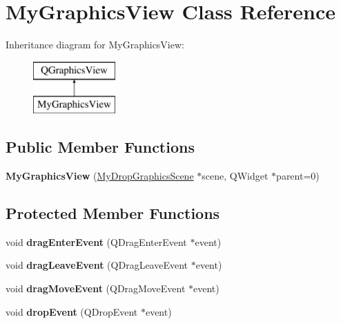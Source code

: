 \hypertarget{class_my_graphics_view}{}\section{My\+Graphics\+View Class Reference}
\label{class_my_graphics_view}
Inheritance diagram for My\+Graphics\+View\+:\begin{figure}[H]
\begin{center}
\leavevmode
\includegraphics[height=2.000000cm]{class_my_graphics_view}
\end{center}
\end{figure}
\subsection*{Public Member Functions}
\begin{DoxyCompactItemize}
\item 
\hypertarget{class_my_graphics_view_a7236beae467bc43ed9f88222b25d4874}{}{\bfseries My\+Graphics\+View} (\hyperlink{class_my_drop_graphics_scene}{My\+Drop\+Graphics\+Scene} $\ast$scene, Q\+Widget $\ast$parent=0)\label{class_my_graphics_view_a7236beae467bc43ed9f88222b25d4874}

\end{DoxyCompactItemize}
\subsection*{Protected Member Functions}
\begin{DoxyCompactItemize}
\item 
\hypertarget{class_my_graphics_view_a22dd9a814c979d818ab322706f0b9297}{}void {\bfseries drag\+Enter\+Event} (Q\+Drag\+Enter\+Event $\ast$event)\label{class_my_graphics_view_a22dd9a814c979d818ab322706f0b9297}

\item 
\hypertarget{class_my_graphics_view_a7c1982f74cf31f7d2b5721e16ed5587a}{}void {\bfseries drag\+Leave\+Event} (Q\+Drag\+Leave\+Event $\ast$event)\label{class_my_graphics_view_a7c1982f74cf31f7d2b5721e16ed5587a}

\item 
\hypertarget{class_my_graphics_view_a3c475cb56178cd729b97fce19008ffe9}{}void {\bfseries drag\+Move\+Event} (Q\+Drag\+Move\+Event $\ast$event)\label{class_my_graphics_view_a3c475cb56178cd729b97fce19008ffe9}

\item 
\hypertarget{class_my_graphics_view_a26906e53c7aa71c8ade8067e98de90b3}{}void {\bfseries drop\+Event} (Q\+Drop\+Event $\ast$event)\label{class_my_graphics_view_a26906e53c7aa71c8ade8067e98de90b3}

\end{DoxyCompactItemize}
